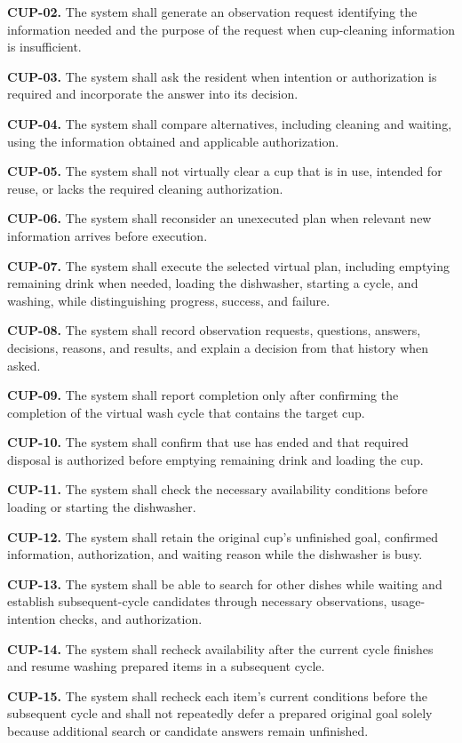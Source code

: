 \documentclass[conference,a4paper]{IEEEtran}
\newcommand{\req}[2]{\par\noindent\textbf{#1.} #2\par\smallskip}
\begin{document}
\req{CUP-02}{The system shall generate an observation request identifying the information needed and the purpose of the request when cup-cleaning information is insufficient.}

\req{CUP-03}{The system shall ask the resident when intention or authorization is required and incorporate the answer into its decision.}

\req{CUP-04}{The system shall compare alternatives, including cleaning and waiting, using the information obtained and applicable authorization.}

\req{CUP-05}{The system shall not virtually clear a cup that is in use, intended for reuse, or lacks the required cleaning authorization.}

\req{CUP-06}{The system shall reconsider an unexecuted plan when relevant new information arrives before execution.}

\req{CUP-07}{The system shall execute the selected virtual plan, including emptying remaining drink when needed, loading the dishwasher, starting a cycle, and washing, while distinguishing progress, success, and failure.}

\req{CUP-08}{The system shall record observation requests, questions, answers, decisions, reasons, and results, and explain a decision from that history when asked.}

\req{CUP-09}{The system shall report completion only after confirming the completion of the virtual wash cycle that contains the target cup.}

\req{CUP-10}{The system shall confirm that use has ended and that required disposal is authorized before emptying remaining drink and loading the cup.}

\req{CUP-11}{The system shall check the necessary availability conditions before loading or starting the dishwasher.}

\req{CUP-12}{The system shall retain the original cup's unfinished goal, confirmed information, authorization, and waiting reason while the dishwasher is busy.}

\req{CUP-13}{The system shall be able to search for other dishes while waiting and establish subsequent-cycle candidates through necessary observations, usage-intention checks, and authorization.}

\req{CUP-14}{The system shall recheck availability after the current cycle finishes and resume washing prepared items in a subsequent cycle.}

\req{CUP-15}{The system shall recheck each item's current conditions before the subsequent cycle and shall not repeatedly defer a prepared original goal solely because additional search or candidate answers remain unfinished.}
\end{document}
